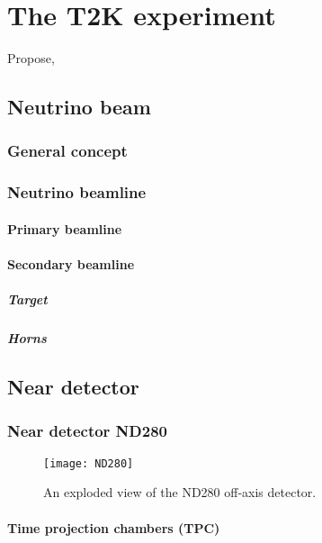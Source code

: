 \documentclass[../main.tex]{subfiles}
\begin{document}
\renewcommand{\labelitemi}{\ding{226}}
\renewcommand{\labelitemii}{\ding{227}}

\part{The T2K experiment}
\label{part:T2K:general}
Propose,

\chapter{Neutrino beam}
\label{ch:T2K:nu_beam}
\section{General concept}
\section{Neutrino beamline}
\subsection{Primary beamline}
\subsection{Secondary beamline}
\subsubsection{Target}
\subsubsection{Horns}


\chapter{Near detector}
\label{ch:T2K:nd}
\section{Near detector ND280}
\label{sec:T2K:nd280}
\begin{figure}[h!]
    \begin{center}
    \texttt{[image: ND280]}
    \caption{An exploded view of the ND280 off-axis detector.}
    \label{fig:T2K:ND280}
    \end{center}
\end{figure}
\subsection{Time projection chambers (TPC)}
\end{document}
